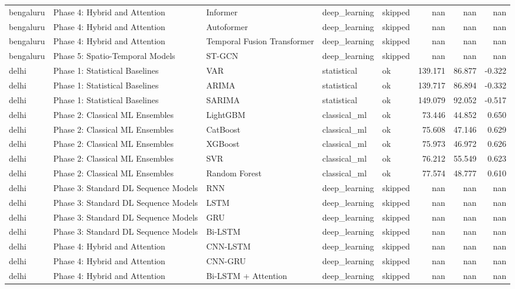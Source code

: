 \documentclass[11pt,a4paper,oneside]{book}
\begin{document}
\begin{longtable}{@{}lllllrrr@{}}
bengaluru & Phase 4: Hybrid and Attention & Informer & deep\_learning & skipped & nan & nan & nan \\
bengaluru & Phase 4: Hybrid and Attention & Autoformer & deep\_learning & skipped & nan & nan & nan \\
bengaluru & Phase 4: Hybrid and Attention & Temporal Fusion Transformer & deep\_learning & skipped & nan & nan & nan \\
bengaluru & Phase 5: Spatio-Temporal Models & ST-GCN & deep\_learning & skipped & nan & nan & nan \\
delhi & Phase 1: Statistical Baselines & VAR & statistical & ok & 139.171 & 86.877 & -0.322 \\
delhi & Phase 1: Statistical Baselines & ARIMA & statistical & ok & 139.717 & 86.894 & -0.332 \\
delhi & Phase 1: Statistical Baselines & SARIMA & statistical & ok & 149.079 & 92.052 & -0.517 \\
delhi & Phase 2: Classical ML Ensembles & LightGBM & classical\_ml & ok & 73.446 & 44.852 & 0.650 \\
delhi & Phase 2: Classical ML Ensembles & CatBoost & classical\_ml & ok & 75.608 & 47.146 & 0.629 \\
delhi & Phase 2: Classical ML Ensembles & XGBoost & classical\_ml & ok & 75.973 & 46.972 & 0.626 \\
delhi & Phase 2: Classical ML Ensembles & SVR & classical\_ml & ok & 76.212 & 55.549 & 0.623 \\
delhi & Phase 2: Classical ML Ensembles & Random Forest & classical\_ml & ok & 77.574 & 48.777 & 0.610 \\
delhi & Phase 3: Standard DL Sequence Models & RNN & deep\_learning & skipped & nan & nan & nan \\
delhi & Phase 3: Standard DL Sequence Models & LSTM & deep\_learning & skipped & nan & nan & nan \\
delhi & Phase 3: Standard DL Sequence Models & GRU & deep\_learning & skipped & nan & nan & nan \\
delhi & Phase 3: Standard DL Sequence Models & Bi-LSTM & deep\_learning & skipped & nan & nan & nan \\
delhi & Phase 4: Hybrid and Attention & CNN-LSTM & deep\_learning & skipped & nan & nan & nan \\
delhi & Phase 4: Hybrid and Attention & CNN-GRU & deep\_learning & skipped & nan & nan & nan \\
delhi & Phase 4: Hybrid and Attention & Bi-LSTM + Attention & deep\_learning & skipped & nan & nan & nan \\

\end{longtable}
\end{document}
